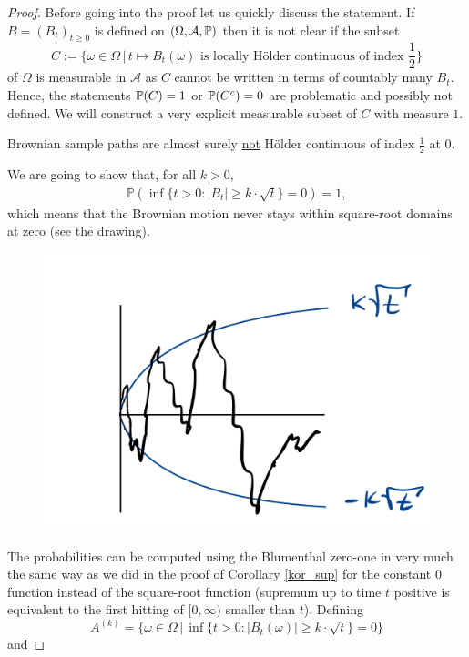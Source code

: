 \begin{proof}[Proof]
	Before going into the proof let us quickly discuss the statement. If $B=(B_t)_{t\geq 0}$ is defined on $(\Omega, \mathcal A, \P)$ then it is not clear if the subset $$C:=\Big\{\omega\in \Omega\,\Big|\, t\mapsto B_t(\omega)\text{ is locally H\"older continuous of index }\frac{1}{2}\Big\}$$ of $\Omega$ is measurable in $\mathcal A$ as $C$ cannot be written in terms of countably many $B_t$. Hence, the statements $\P(C)=1$ or $\P(C^c)=0$ are problematic and possibly not defined. We will construct a very explicit measurable subset of $C$ with measure $1$.
	\begin{lstep}
		Brownian sample paths are almost surely \underline{not} H\"older continuous of index $\frac{1}{2}$ at $0$.
	\end{lstep}
	We are going to show that, for all $k>0$,
	\begin{align*}
		\mathbb{P}\left(\inf\{ t>0\colon |B_t| \geq k \cdot \sqrt{t}\}=0\right)=1,%
	\end{align*}
	which means that the Brownian motion never stays within square-root domains at zero (see the drawing).
	\begin{figure}[h]
		\begin{center}
			\includegraphics[scale=0.12]{sqrt.jpeg}
		\end{center}
	\end{figure}	
	The probabilities can be computed using the Blumenthal zero-one in very much the same way as we did in the proof of Corollary \ref{kor_sup} for the constant $0$ function instead of the square-root function (supremum up to time $t$ positive is equivalent to the first hitting of $[0,\infty)$ smaller than $t$). Defining $$A^{(k)} =\big\{\omega\in \Omega\,|\, \inf\{t>0\colon |B_t(\omega)| \geq k\cdot\sqrt{t}\}=0\big\}$$ and 	

\end{proof}
